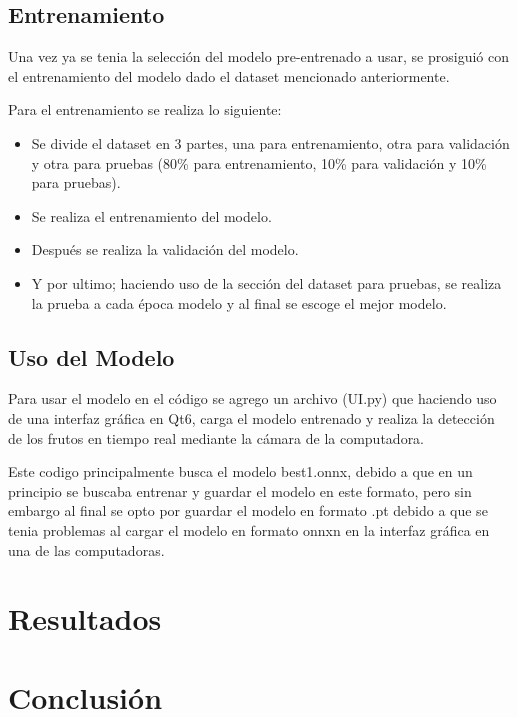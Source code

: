 \documentclass[conference]{IEEEtran}
\begin{document}
\subsection{Entrenamiento}
Una vez ya se tenia la selección del modelo pre-entrenado a usar, se prosiguió con el entrenamiento del modelo dado el dataset mencionado anteriormente\cite{}.

Para el entrenamiento se realiza lo siguiente:
\begin{itemize}
    \item Se divide el dataset en 3 partes, una para entrenamiento, otra para validación y otra para pruebas (80\% para entrenamiento, 10\% para validación y 10\% para pruebas).
    \item Se realiza el entrenamiento del modelo.
    \item Después se realiza la validación del modelo.
    \item Y por ultimo; haciendo uso de la sección del dataset para pruebas, se realiza la prueba a cada época modelo y al final se escoge el mejor modelo.
\end{itemize}

\subsection{Uso del Modelo}
Para usar el modelo en el código se agrego un archivo (UI.py) que haciendo uso de una interfaz gráfica en Qt6, carga el modelo entrenado y realiza la detección de los frutos en tiempo real mediante la cámara de la computadora.

Este codigo principalmente busca el modelo best1.onnx, debido a que en un principio se buscaba entrenar y guardar el modelo en este formato, pero sin embargo al final se opto por guardar el modelo en formato .pt debido a que se tenia problemas al cargar el modelo en formato onnxn en la interfaz gráfica en una de las computadoras.

\section{Resultados}



\section{Conclusión}


\nocite{calcularRangos}
\printbibliography
\end{document}
